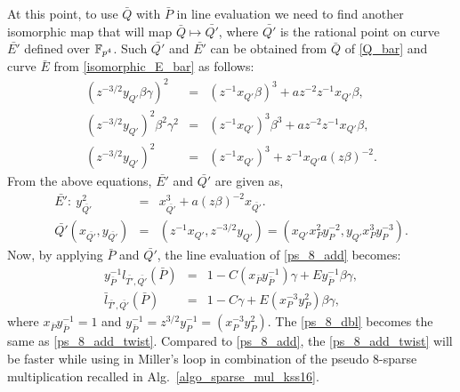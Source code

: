 At this point, to use $\bar{Q}$ with $\bar{P}$ in line evaluation we need to find another isomorphic map that will map $\bar{Q} \mapsto \bar{Q'}$, where $\bar{Q'}$ is the rational point on curve  $\bar{E'}$ defined over $\mathbb{F}_{p^4}$. Such $\bar{Q'}$ and $\bar{E'}$ can be obtained from $\bar{Q}$ of \eqref{Q_bar} and curve $\bar{E}$ from \eqref{isomorphic_E_bar} as follows:
\begin{eqnarray} 
(z^{-3/2}y_{Q'}\beta\gamma )^2 &=& (z^{-1}x_{Q'}\beta)^3+az^{-2}z^{-1}x_{Q'}\beta, \nonumber \\
(z^{-3/2}y_{Q'})^2 \beta^2 \gamma^2 &=& (z^{-1}x_{Q'})^3\beta^3+az^{-2}z^{-1}x_{Q'}\beta, \nonumber \\
(z^{-3/2}y_{Q'})^2  &=& (z^{-1}x_{Q'})^3+z^{-1}x_{Q'}a(z\beta)^{-2}. \nonumber
\end{eqnarray}
From the above equations, $\bar{E'}$ and $\bar{Q'}$ are given as,
\begin{eqnarray}
\bar{E'}: ~y_{\bar{Q'}}^2 & = & x_{\bar{Q'}}^3+a(z\beta)^{-2}x_{\bar{Q'}}. \label{E_bar_prime}\\
\bar{Q'}(x_{\bar{Q'}}, y_{\bar{Q'}}) & = & (z^{-1}x_{Q'}, z^{-3/2}y_{Q'})= 
(x_{Q'} x_P^2y_P^{-2},y_{Q'} x_P^3y_{P}^{-3}) \label{Q_bar_prime}. 
\end{eqnarray}
Now, by applying $\bar{P}$ and $\bar{Q'}$, the line evaluation of  \eqref{ps_8_add} becomes:
\begin{eqnarray}
y_{\bar{P}}^{-1} l_{\bar{T'},\bar{Q'}}(\bar{P})&=& 1-C(x_{\bar{P}}y_{\bar{P}}^{-1})\gamma+E y_{\bar{P}}^{-1}\beta\gamma,  \nonumber \\
\bar{l}_{\bar{T'},\bar{Q'}}(\bar{P}) &=& 1 -C\gamma+E (x_{P}^{-3} y_{P}^2)\beta\gamma , \label{ps_8_add_twist}
\end{eqnarray}
where $x_{\bar{P}}y_{\bar{P}}^{-1}=1$ and $y_{\bar{P}}^{-1} = z^{3/2}y_{P}^{-1}=(x_{P}^{-3} y_{P}^2)$. The \eqref{ps_8_dbl} becomes the same as \eqref{ps_8_add_twist}. 
Compared to \eqref{ps_8_add}, the \eqref{ps_8_add_twist} will be faster while using in Miller's loop in combination of the pseudo 8-sparse multiplication recalled in Alg.~\ref{algo_sparse_mul_kss16}.

